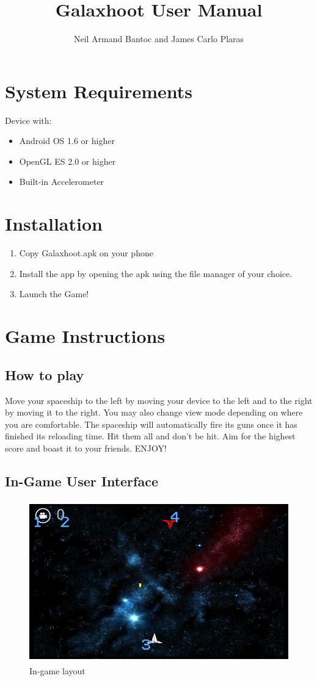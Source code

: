 \documentclass[12pt,a4paper]{article}
\author{Neil Armand Bantoc and James Carlo Plaras}
\title{Galaxhoot User Manual}
\date{}
\begin{document}
\maketitle
\section{System Requirements}
Device with:
\begin{itemize}
\item Android OS 1.6 or higher
\item OpenGL ES 2.0 or higher
\item Built-in Accelerometer
\end{itemize}

\section{Installation}

\begin{enumerate}
\item Copy Galaxhoot.apk on your phone
\item Install the app by opening the apk using the file manager of your choice.
\item Launch the Game!
\end{enumerate}

\newpage
\section{Game Instructions}
\subsection{How to play}
Move your spaceship to the left by moving your device to the left and to the right by moving it to the right. You may also change view mode depending on where you are comfortable. The spaceship will automatically fire its guns once it has finished its reloading time. Hit them all and don't be hit. Aim for the highest score and boast it to your friends. ENJOY!

\subsection{In-Game User Interface}
\begin{figure}[h]
\centering 
  \includegraphics[height=70mm]{images/UILayout.png}
  \caption{In-game layout}
\end{figure}
\end{document}
